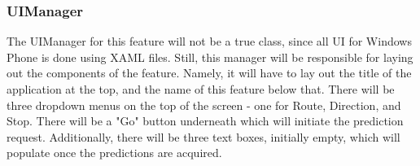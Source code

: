 \documentclass[pdftex,12pt,letter]{article}
\begin{document}
\subsubsection{UIManager}
The UIManager for this feature will not be a true class, since all UI for Windows Phone is done using XAML files. Still, this manager will be responsible for laying out the components of the feature. Namely, it will have to lay out the title of the application at the top, and the name of this feature below that. There will be three dropdown menus on the top of the screen - one for Route, Direction, and Stop. There will be a "Go" button underneath which will initiate the prediction request. Additionally, there will be three text boxes, initially empty, which will populate once the predictions are acquired.

\end{document}
